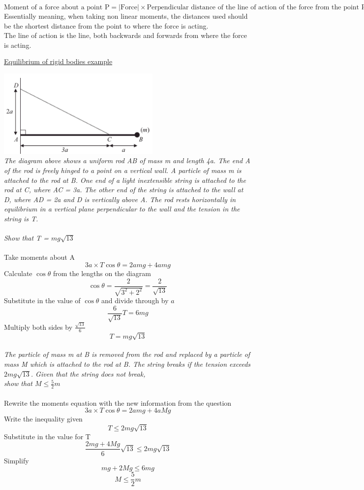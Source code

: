 \documentclass{article}[18pt]
\begin{document}
$$\textrm{Moment of a force about a point P}=|\textrm{Force}|\times\textrm{Perpendicular distance of the line of action of the force from the point P}$$
Essentially meaning, when taking non linear moments, the distances used should be the shortest distance from the point to where the force is acting.\\
The line of action is the line, both backwards and forwards from where the force is acting.
\newpage
\begin{center}
\underline{\Huge Equilibrium of rigid bodies example}
\end{center}
\includegraphics[width=8cm]{eq_rigid.png}\\
\textit{The diagram above shows a uniform rod AB of mass m and length 4a. The end A of the rod is
freely hinged to a point on a vertical wall. A particle of mass m is attached to the rod at B. One
end of a light inextensible string is attached to the rod at C, where AC = 3a. The other end of the
string is attached to the wall at D, where AD = 2a and D is vertically above A. The rod rests
horizontally in equilibrium in a vertical plane perpendicular to the wall and the tension in the
string is T. }\\
\\
\textit{Show that T = $mg\sqrt{13}$}\\
\\
Take moments about A 
$$3a\times T\cos\theta=2amg+4amg$$
Calculate $\cos\theta$ from the lengths on the diagram
$$\cos\theta=\frac{2}{\sqrt{3^2+2^2}}=\frac{2}{\sqrt{13}}$$
Substitute in the value of $\cos\theta$ and divide through by $a$
$$\frac{6}{\sqrt{13}}T=6mg$$
Multiply both sides by $\frac{\sqrt{13}}{6}$
$$T=mg\sqrt{13}$$
\\
\textit{The particle of mass m at B is removed from the rod and replaced by a particle of mass M which
is attached to the rod at B. The string breaks if the tension exceeds $2mg\sqrt{13}$. Given that the
string does not break,\\
show that $M\leqslant\frac{5}{2}m$}\\
\\
Rewrite the moments equation with the new information from the question
$$3a\times T\cos\theta=2amg+4aMg$$
Write the inequality given
$$T\leqslant 2mg\sqrt{13}$$
Substitute in the value for T
$$\frac{2mg+4Mg}{6}\sqrt{13}\leqslant2mg\sqrt{13}$$
Simplify
$$mg+2Mg\leqslant 6mg$$
$$M\leqslant\frac{5}{2}m$$
\end{document}
